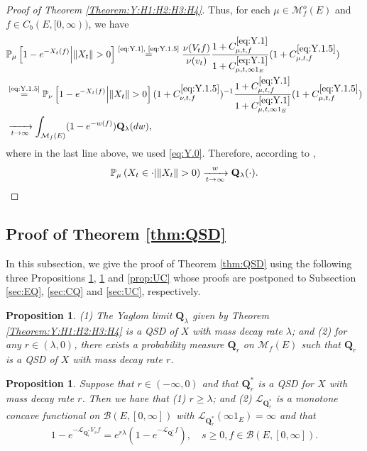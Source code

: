 \documentclass[12pt,a4paper]{amsart}
\numberwithin{equation}{section}
\theoremstyle{plain}
\newtheorem{prop}[thm]{Proposition}
\theoremstyle{definition}
\theoremstyle{remark}
\begin{document}
\begin{proof}[Proof of Theorem \ref{Theorem:Y:H1:H2:H3:H4}]
	Thus, for each $\mu \in \mathcal M^o_f(E)$ and $f\in C_b(E,[0,\infty))$, we have
\begin{align}
&\mathbb P_\mu \left[1 - e^{-X_t(f)} \middle|\|X_t\|>0\right]
	 \overset{\text{\eqref{eq:Y.1}, \eqref{eq:Y.1.5}}}= \frac{ \nu(V_tf) }{ \nu(v_t) } \frac{1+C^{\eqref{eq:Y.1}}_{\mu,t,f}}{1+C^{\eqref{eq:Y.1}}_{\mu, t,\infty 1_E}}(1+ C^{\eqref{eq:Y.1.5}}_{\mu,t,f})
	\\& \overset{\text{\eqref{eq:Y.1.5}}}= \mathbb P_\nu \left[1 - e^{-X_t(f)} \middle| \|X_t\|>0\right](1+C^{\eqref{eq:Y.1.5}}_{\nu, t,f})^{-1}  \frac{1+C^{\eqref{eq:Y.1}}_{\mu,t,f}}{1+C^{\eqref{eq:Y.1}}_{\mu,  t,\infty 1_E}}(1+ C^{\eqref{eq:Y.1.5}}_{\mu,t,f})
	\\&\xrightarrow[t\to \infty]{} \int_{\mathcal M_f(E)}(1-e^{-w(f)}) \mathbf Q_\lambda(dw),
\end{align}
	where in the last line above, we used \eqref{eq:Y.0}.
	Therefore, according to \cite[Theorem 1.18]{Li2011MeasureValued},
	\[\mathbb P_\mu\left(X_t \in \cdot \middle| \|X_t\|>0\right) 
\xrightarrow[t\to \infty]{w} 
\mathbf Q_\lambda(\cdot). \qedhere\]
\end{proof}

\subsection{Proof of Theorem \ref{thm:QSD}}
	In this subsection,
	we give the proof of Theorem \ref{thm:QSD} using the following three
Propositions \ref{prop:EQ}, \ref{prop:CQ} and \ref{prop:UC}  whose proofs are postponed to
Subsection \ref{sec:EQ}, \ref{sec:CQ} and \ref{sec:UC}, respectively.

\begin{prop} \label{prop:EQ}
	(1) The Yaglom limit $\mathbf Q_\lambda$ given by Theorem \ref{Theorem:Y:H1:H2:H3:H4} is a QSD of $X$ with mass decay rate $\lambda$; and
	(2) for any $r \in (\lambda , 0)$,
	there exists a probability measure $\mathbf Q_r$  on $\mathcal M_f(E)$
such that  $\mathbf Q_r$ is a QSD of $X$ with mass decay rate $r$.
\end{prop}


\begin{prop} \label{prop:CQ}
	Suppose that $r \in (-\infty, 0)$ and that  $\mathbf Q^*_{r}$
	is a QSD
	for $X$ with mass decay rate $r$.
	Then we have that (1) $r \geq \lambda$; and
	(2) $\mathscr L_{\mathbf Q^*_r}$ is a monotone concave functional on $\mathcal B(E,[0,\infty])$ with $\mathscr L_{\mathbf Q^*_r}(\infty 1_E) = \infty$ and that
\[
	1 - e^{- \mathscr L_{\mathbf Q^*_r} V_s f} = e^{r\lambda }(1- e^{- \mathscr L_{\mathbf Q^*_r} f}), \quad s\geq 0, f\in \mathcal B(E,[0,\infty]).
\]
\end{prop}
\end{document}
